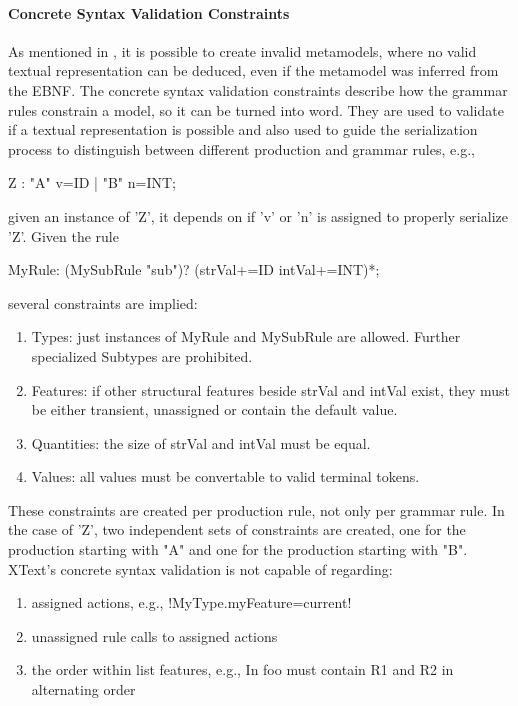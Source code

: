 \paragraph{Concrete Syntax Validation Constraints}
As mentioned in \cite{MofCfg}, it is possible to create invalid metamodels, where no valid textual representation can be deduced, even if the metamodel was inferred from the EBNF. The concrete syntax validation constraints describe how the grammar rules constrain a model, so it can be turned into word. They are used to validate if a textual representation is possible and also used to guide the serialization process to distinguish between different production and grammar rules, e.g.,
\begin{xtxt}
Z 	:  "A" v=ID  
	|  "B" n=INT;
\end{xtxt}
given an instance of 'Z', it depends on if 'v' or 'n' is assigned to properly serialize 'Z'.
Given the rule
\begin{xtxt}
MyRule:	({MySubRule} "sub")? (strVal+=ID intVal+=INT)*;
\end{xtxt}
several constraints are implied:
\begin{enumerate}
	\item Types: just instances of MyRule and MySubRule are allowed. Further specialized Subtypes are prohibited. 
	\item Features: if other structural features beside strVal and intVal exist, they must be either transient, unassigned or contain the default value.
	\item Quantities: the size of strVal and intVal must be equal.
	\item Values: all values must be convertable to valid terminal tokens.
\end{enumerate}
These constraints are created per production rule, not only per grammar rule. In the case of 'Z', two independent sets of constraints are created, one for the production starting with "A" and one for the production starting with "B".
XText's concrete syntax validation is not capable of regarding:
\begin{enumerate}
	\item assigned actions, e.g., 
	\kode!{MyType.myFeature=current}!
	\item unassigned rule calls to assigned actions
	\item the order within list features, e.g., In  foo must contain R1 and R2 in alternating order
\end{enumerate}

